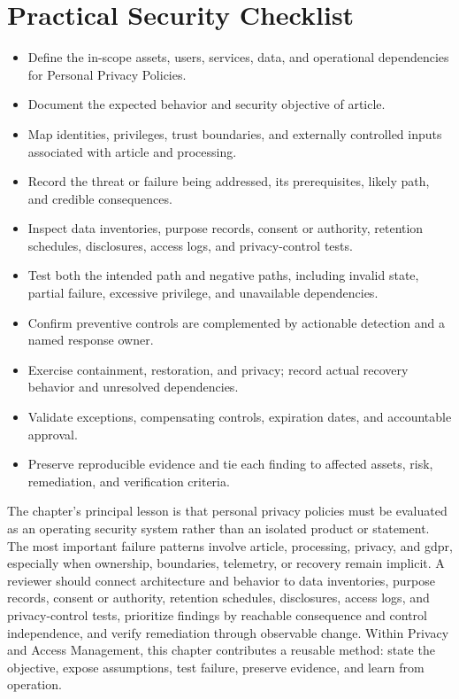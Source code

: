 \documentclass[11pt]{article}
\begin{document}
\section*{Practical Security Checklist}
\begin{itemize}[label=$\square$]
\item Define the in-scope assets, users, services, data, and operational dependencies for Personal Privacy Policies.
\item Document the expected behavior and security objective of article.
\item Map identities, privileges, trust boundaries, and externally controlled inputs associated with article and processing.
\item Record the threat or failure being addressed, its prerequisites, likely path, and credible consequences.
\item Inspect data inventories, purpose records, consent or authority, retention schedules, disclosures, access logs, and privacy-control tests.
\item Test both the intended path and negative paths, including invalid state, partial failure, excessive privilege, and unavailable dependencies.
\item Confirm preventive controls are complemented by actionable detection and a named response owner.
\item Exercise containment, restoration, and privacy; record actual recovery behavior and unresolved dependencies.
\item Validate exceptions, compensating controls, expiration dates, and accountable approval.
\item Preserve reproducible evidence and tie each finding to affected assets, risk, remediation, and verification criteria.
\end{itemize}
\begin{synthesisbox}
The chapter's principal lesson is that personal privacy policies must be evaluated as an operating security system rather than an isolated product or statement. The most important failure patterns involve article, processing, privacy, and gdpr, especially when ownership, boundaries, telemetry, or recovery remain implicit. A reviewer should connect architecture and behavior to data inventories, purpose records, consent or authority, retention schedules, disclosures, access logs, and privacy-control tests, prioritize findings by reachable consequence and control independence, and verify remediation through observable change. Within Privacy and Access Management, this chapter contributes a reusable method: state the objective, expose assumptions, test failure, preserve evidence, and learn from operation.
\end{synthesisbox}
\end{document}
